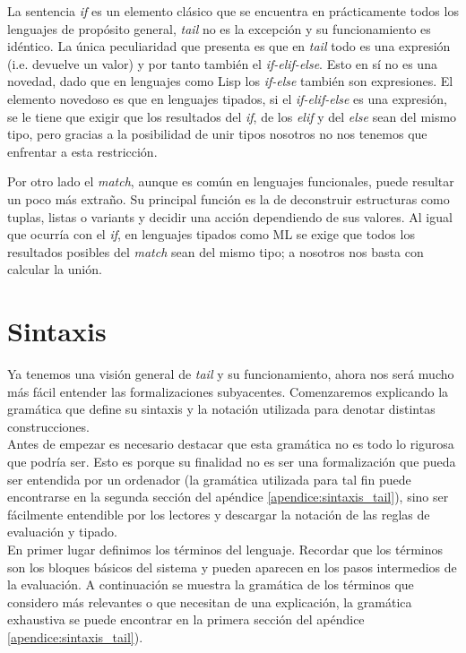 La sentencia \textit{if} es un elemento clásico que se encuentra en prácticamente todos los lenguajes de propósito general, \textit{tail} no es la excepción y su funcionamiento es idéntico. La única peculiaridad que presenta es que en \textit{tail} todo es una expresión (i.e. devuelve un valor) y por tanto también el \textit{if-elif-else}. Esto en sí no es una novedad, dado que en lenguajes como Lisp los \textit{if-else} también son expresiones. El elemento novedoso es que en lenguajes tipados, si el \textit{if-elif-else} es una expresión, se le tiene que exigir que los resultados del \textit{if}, de los \textit{elif} y del \textit{else} sean del mismo tipo, pero gracias a la posibilidad de unir tipos nosotros no nos tenemos que enfrentar a esta restricción.

Por otro lado el \textit{match}, aunque es común en lenguajes funcionales, puede resultar un poco más extraño. Su principal función es la de deconstruir estructuras como tuplas, listas o variants y decidir una acción dependiendo de sus valores. Al igual que ocurría con el \textit{if}, en lenguajes tipados como ML se exige que todos los resultados posibles del \textit{match} sean del mismo tipo; a nosotros nos basta con calcular la unión.

\section{Sintaxis} \label{sect:sintaxis}

Ya tenemos una visión general de \textit{tail} y su funcionamiento, ahora nos será mucho más fácil entender las formalizaciones subyacentes. Comenzaremos explicando la gramática que define su sintaxis y la notación utilizada para denotar distintas construcciones.\\

Antes de empezar es necesario destacar que esta gramática no es todo lo rigurosa que podría ser. Esto es porque su finalidad no es ser una formalización que pueda ser entendida por un ordenador (la gramática utilizada para tal fin puede encontrarse en la segunda sección del apéndice \ref{apendice:sintaxis_tail}), sino ser fácilmente entendible por los lectores y descargar la notación de las reglas de evaluación y tipado.\\

En primer lugar definimos los términos del lenguaje. Recordar que los términos son los bloques básicos del sistema y pueden aparecen en los pasos intermedios de la evaluación. A continuación se muestra la gramática de los términos que considero más relevantes o que necesitan de una explicación, la gramática exhaustiva se puede encontrar en la primera sección del apéndice \ref{apendice:sintaxis_tail}).

